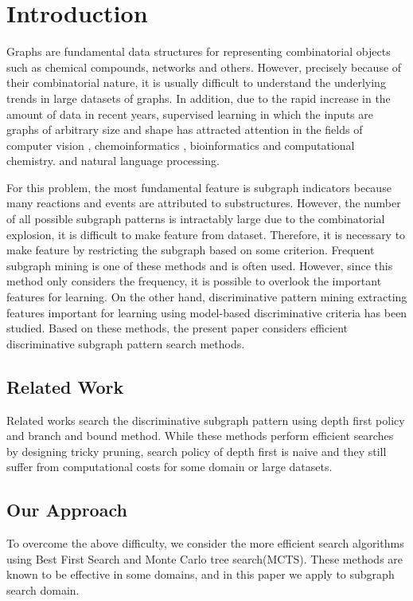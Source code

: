 \section{Introduction}
Graphs are fundamental data structures for representing combinatorial objects 
such as chemical compounds, networks and others.
However, precisely because of their combinatorial nature, 
it is usually difficult to understand the underlying trends in large datasets of graphs.
In addition, due to the rapid increase in the amount of data in recent years, 
supervised learning in which the inputs are graphs of arbitrary size and shape has attracted attention
in the fields of computer vision \cite{Harchaoui:2007, Nowozin:2007, Barra:2013, Bai:2014a},
chemoinformatics \cite{Kashima:2003, Tsuda:2007,Saigo:2008a, Saigo:2009,Mahe:2009, 
Vishwanathan:2010, Shrvashidze:2011, Takigawa:2013, takigawa:2017},
bioinformatics\cite{Borgwardt:2005, Karklin:2005, Takigawa:2011b} 
and computational chemistry\cite{Kearnes2016, gilmer:2017}.
and natural language processing\cite{Kudo:2005}. 

For this problem, the most fundamental feature is subgraph indicators 
because many reactions and events are attributed to substructures.
However, the number of all possible subgraph patterns is intractably large 
due to the combinatorial explosion, it is difficult to make feature from dataset.
Therefore, it is necessary to make feature by restricting the subgraph based on some criterion.
Frequent subgraph mining \cite{Yan:2002, Nijssen:2004} is one of these methods and is often used.
However, since this method only considers the frequency, 
it is possible to overlook the important features for learning.
On the other hand, discriminative pattern mining \cite{Fan:2008, Saigo:2009, Shirakawa:2018} 
extracting features important for learning using model-based discriminative criteria has been studied.
Based on these methods, the present paper considers efficient discriminative subgraph pattern search methods.

\subsection{Related Work}
\label{sec:relatedwork}
Related works \cite{Saigo:2009, Shirakawa:2018} search the discriminative subgraph pattern
using depth first policy and branch and bound method.
While these methods perform efficient searches by designing tricky pruning, 
search policy of depth first is naive and 
they still suffer from computational costs for some domain or large datasets.

\subsection{Our Approach}
\label{sec:ourapproach}
To overcome the above difficulty, 
we consider the more efficient search algorithms
using Best First Search and Monte Carlo tree search(MCTS).
These methods are known to be effective in some domains, 
and in this paper we apply to subgraph search domain.
